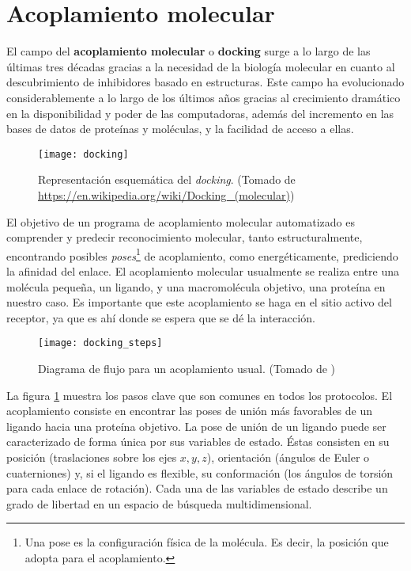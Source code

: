 \section{Acoplamiento molecular}
El campo del \textbf{acoplamiento molecular} o
\textbf{docking} surge a lo largo de las últimas tres décadas gracias a la
necesidad de la biología molecular en cuanto al descubrimiento de
inhibidores basado en estructuras. Este campo ha evolucionado
considerablemente a lo largo de los últimos años gracias al
crecimiento dramático en la disponibilidad y poder de las
computadoras, además del incremento en las bases de datos de proteínas
y moléculas, y la facilidad de acceso a ellas.\cite{kukol}

\begin{figure}[H]
  \texttt{[image: docking]} \centering
  \caption{Representación esquemática del \textit{docking}.  (Tomado de
    \url{https://en.wikipedia.org/wiki/Docking_(molecular)})}
\end{figure}

El objetivo de un programa de acoplamiento molecular automatizado es
comprender y predecir reconocimiento molecular, tanto
estructuralmente, encontrando posibles \textit{poses}\footnote{Una
pose es la configuración física de la molécula. Es decir, la posición
que adopta para el acoplamiento.} de acoplamiento, como
energéticamente, prediciendo la afinidad del enlace. El acoplamiento
molecular usualmente se realiza entre una molécula pequeña, un
ligando, y una macromolécula objetivo, una proteína en nuestro
caso. Es importante que este acoplamiento se haga en el sitio activo
del receptor, ya que es ahí donde se espera que se dé la interacción.

\begin{center}
\begin{figure}[H]
  \texttt{[image: docking\_steps]}
  \caption{Diagrama de flujo para un acoplamiento usual.  (Tomado de
    \cite{kukol})}
  \label{fig:docking_flowchart}
\end{figure}
\end{center}

La figura \ref{fig:docking_flowchart} muestra los pasos clave que son
comunes en todos los protocolos. El acoplamiento consiste en encontrar
las poses de unión más favorables de un ligando hacia una proteína
objetivo. La pose de unión de un ligando puede ser caracterizado de
forma única por sus variables de estado. Éstas consisten en su
posición (traslaciones sobre los ejes $x, y, z$), orientación (ángulos
de Euler o cuaterniones) y, si el ligando es flexible, su conformación
(los ángulos de torsión para cada enlace de rotación). Cada una de las
variables de estado describe un grado de libertad en un espacio de
búsqueda multidimensional.

